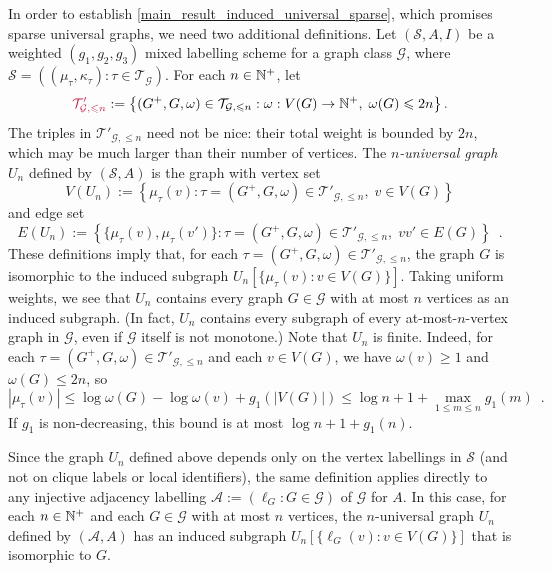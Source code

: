 \documentclass{patmorin}
\makeatletter
\renewcommand{\ge}{\geqslant}
\renewcommand{\le}{\leqslant}
\newcommand{\defin}[1]{\emph{\textcolor{brightmaroon}{#1}}}
\def\mathcolor#1#{\@mathcolor{#1}}
\def\@mathcolor#1#2#3{%
  \protect\leavevmode
  \begingroup
    \color#1{#2}#3%
  \endgroup
}
\newcommand{\mathdefin}[1]{\mathcolor{brightmaroon}{#1}}
\newcommand{\calA}{\mathcal{A}}
\newcommand{\calG}{\mathcal{G}}
\newcommand{\calS}{\mathcal{S}}
\newcommand{\calT}{\mathcal{T}}
\makeatother
\begin{document}
In order to establish \cref{main_result_induced_universal_sparse}, which promises sparse universal graphs, we need two additional definitions.
Let $(\calS,A,I)$ be a weighted $(g_1,g_2,g_3)$ mixed labelling scheme for a graph class $\calG$, where $\calS = ((\mu_\tau,\kappa_\tau):\tau\in\calT_\calG)$.  For each $n\in\mathbb{N}^+$, let
\[
  \mathdefin{\calT'_{\calG,\le n}}:=\left\{(G^+,G,\omega)\in\calT_{\calG,\le n}: \omega:V(G)\to\N^+,\; \omega(G)\le 2n\right\}.
\]
The triples in $\calT'_{\calG,\le n}$ need not be nice: their total weight is bounded by $2n$, which may be much larger than their number of vertices. The \defin{$n$-universal graph} $U_n$ defined by $(\calS,A)$ is the graph with vertex set
\[
V(U_n):=\left\{ \mu_\tau(v): \tau = (G^+,G,\omega)\in\calT'_{\calG,\le n},\; v\in V(G) \right\}
\]
and edge set
\[
  E(U_n):=\left\{ \{\mu_\tau(v),\mu_\tau(v')\}: \tau = (G^+,G,\omega)\in\calT'_{\calG,\le n},\; vv'\in E(G) \right\}
  \enspace.
\]
These definitions imply that, for each $\tau = (G^+,G,\omega)\in\calT'_{\calG,\le n}$, the graph $G$ is isomorphic to the induced subgraph $U_n[\{\mu_\tau(v):v\in V(G)\}]$.  Taking uniform weights, we see that $U_n$ contains every graph $G\in\calG$ with at most $n$ vertices as an induced subgraph. (In fact, $U_n$ contains every subgraph of every at-most-$n$-vertex graph in $\calG$, even if $\calG$ itself is not monotone.)  Note that $U_n$ is finite. Indeed, for each $\tau=(G^+,G,\omega)\in\calT'_{\calG,\le n}$ and each $v\in V(G)$, we have $\omega(v)\ge 1$ and $\omega(G)\le 2n$, so
\[
  |\mu_\tau(v)|\le \log\omega(G)-\log\omega(v)+g_1(|V(G)|)
  \le \log n+1+\max_{1\le m\le n}g_1(m)\enspace.
\]
If $g_1$ is non-decreasing, this bound is at most $\log n+1+g_1(n)$.

Since the graph $U_n$ defined above depends only on the vertex labellings in $\calS$ (and not on clique labels or local identifiers), the same definition applies directly to any injective adjacency labelling $\calA:=(\ell_G:G\in\calG)$ of $\calG$ for $A$. In this case, for each $n\in\mathbb{N}^+$ and each $G\in\calG$ with at most $n$ vertices, the $n$-universal graph $U_n$ defined by $(\calA,A)$ has an induced subgraph $U_n[\{\ell_G(v):v\in V(G)\}]$ that is isomorphic to $G$.
\end{document}
